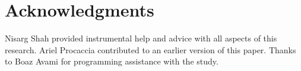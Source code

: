 \documentclass[runningheads]{llncs}
\begin{document}




\section{Acknowledgments}
Nisarg Shah provided instrumental help and advice with all aspects of this research. Ariel Procaccia contributed to an earlier version of this paper. Thanks to Boaz Avami for programming assistance with the study. 



%
%
%
% 

\end{document}
